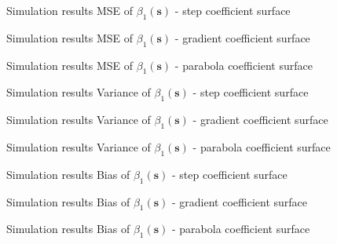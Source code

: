 \documentclass[12pt,t,handout]{beamer}
\newcommand{\subt}[1]{{\footnotesize \color{subtitle} {#1}}}
\begin{document}
\begin{frame}{Simulation results}
\subt{MSE of $\beta_1(\bm{s})$ - step coefficient surface}

\end{frame}



\begin{frame}{Simulation results}
\subt{MSE of $\beta_1(\bm{s})$ - gradient coefficient surface}

\end{frame}


\begin{frame}{Simulation results}
\subt{MSE of $\beta_1(\bm{s})$ - parabola coefficient surface}

\end{frame}





\begin{frame}{Simulation results}
\subt{Variance of $\beta_1(\bm{s})$ - step coefficient surface}

\end{frame}


\begin{frame}{Simulation results}
\subt{Variance of $\beta_1(\bm{s})$ - gradient coefficient surface}

\end{frame}


\begin{frame}{Simulation results}
\subt{Variance of $\beta_1(\bm{s})$ - parabola coefficient surface}

\end{frame}




\begin{frame}{Simulation results}
\subt{Bias of $\beta_1(\bm{s})$ - step coefficient surface}

\end{frame}


\begin{frame}{Simulation results}
\subt{Bias of $\beta_1(\bm{s})$ - gradient coefficient surface}

\end{frame}


\begin{frame}{Simulation results}
\subt{Bias of $\beta_1(\bm{s})$ - parabola coefficient surface}

\end{frame}
\end{document}
